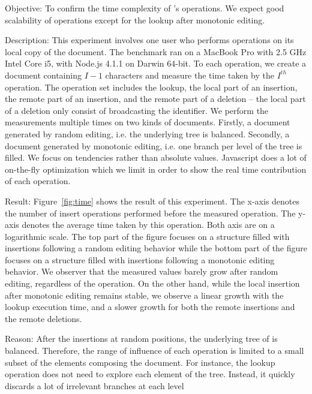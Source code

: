 \begin{asparadesc}
\item [Objective:] To confirm the time complexity of \LSEQ's operations. We
  expect good scalability of operations except for the lookup after monotonic
  editing.
\item [Description:] This experiment involves one user who performs operations
  on its local copy of the document. The benchmark ran on a MacBook Pro with 2.5
  GHz Intel Core i5, with Node.js 4.1.1 on Darwin 64-bit. To each operation, we
  create a document containing $I-1$ characters and measure the time taken by
  the $I^{th}$ operation. The operation set includes the lookup, the local part
  of an insertion, the remote part of an insertion, and the remote part of a
  deletion -- the local part of a deletion only consist of broadcasting the
  identifier. We perform the measurements multiple times on two kinds of
  documents. Firstly, a document generated by random editing, i.e. the
  underlying \LSEQ tree is balanced. Secondly, a document generated by monotonic
  editing, i.e. one branch per level of the \LSEQ tree is filled.  We focus on
  tendencies rather than absolute values. Javascript does a lot of on-the-fly
  optimization which we limit in order to show the real time contribution of
  each operation.
\item [Result:] Figure~\ref{fig:time} shows the result of this experiment. The
  x-axis denotes the number of insert operations performed before the measured
  operation. The y-axis denotes the average time taken by this operation. Both
  axis are on a logarithmic scale. The top part of the figure focuses on a
  structure filled with insertions following a random editing behavior while the
  bottom part of the figure focuses on a structure filled with insertions
  following a monotonic editing behavior. We observer that the measured values
  barely grow after random editing, regardless of the operation. On the other
  hand, while the local insertion after monotonic editing remains stable, we
  observe a linear growth with the lookup execution time, and a slower growth
  for both the remote insertions and the remote deletions.
\item [Reason:] After the insertions at random positions, the underlying tree of
  \LSEQ is balanced. Therefore, the range of influence of each operation is
  limited to a small subset of the elements composing the document. For
  instance, the lookup operation does not need to explore each element of the
  tree. Instead, it quickly discards a lot of irrelevant branches at each level

\end{asparadesc}

